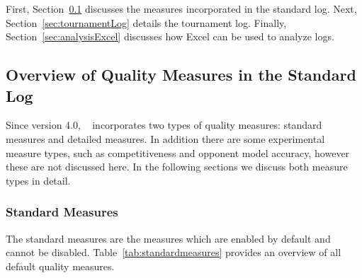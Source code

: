\documentclass[]{article}
\begin{document}
First, Section~\ref{sec:standardLog} discusses the measures incorporated in the standard log. Next, Section~\ref{sec:tournamentLog} details the tournament log. Finally, Section~\ref{sec:analysisExcel} discusses how Excel can be used to analyze logs.

\subsection{Overview of Quality Measures in the Standard Log}\label{sec:standardLog}
Since version 4.0, \Genius~ incorporates two types of quality measures: standard measures and detailed measures. In addition there are some experimental measure types, such as competitiveness and opponent model accuracy, however these are not discussed here. In the following sections we discuss both measure types in detail.

\subsubsection{Standard Measures}
The standard measures are the measures which are enabled by default and cannot be disabled. Table~\ref{tab:standardmeasures} provides an overview of all default quality measures.
\end{document}
